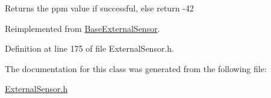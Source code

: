 \begin{DoxyReturn}{Returns}
the ppm value if successful, else return -\/42 
\end{DoxyReturn}


Reimplemented from \hyperlink{class_base_external_sensor_a7e0a98f350148d7645031315657aa5ec}{Base\+External\+Sensor}.



Definition at line 175 of file External\+Sensor.\+h.



The documentation for this class was generated from the following file\+:\begin{DoxyCompactItemize}
\item 
\hyperlink{_external_sensor_8h}{External\+Sensor.\+h}\end{DoxyCompactItemize}
